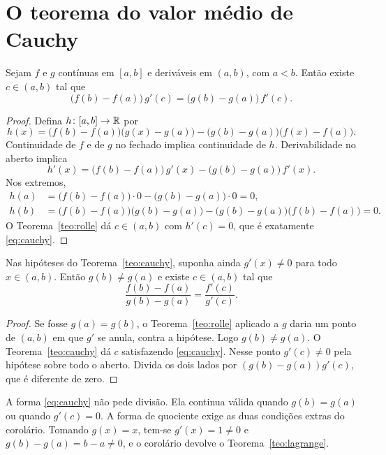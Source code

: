 \documentclass[11pt,a4paper]{article}
\begin{document}
\section{O teorema do valor médio de Cauchy}

\begin{teorema}\label{teo:cauchy}
Sejam $f$ e $g$ contínuas em $[a,b]$ e deriváveis em $(a,b)$, com $a<b$. Então existe $c\in(a,b)$ tal que
\begin{equation}
\label{eq:cauchy}
\bigl(f(b)-f(a)\bigr)\,g'(c)=\bigl(g(b)-g(a)\bigr)\,f'(c).
\end{equation}
\end{teorema}

\begin{proof}
Defina $h\colon[a,b]\to\mathbb{R}$ por
\[
h(x)=\bigl(f(b)-f(a)\bigr)\bigl(g(x)-g(a)\bigr)-\bigl(g(b)-g(a)\bigr)\bigl(f(x)-f(a)\bigr).
\]
Continuidade de $f$ e de $g$ no fechado implica continuidade de $h$. Derivabilidade no aberto implica
\[
h'(x)=\bigl(f(b)-f(a)\bigr)\,g'(x)-\bigl(g(b)-g(a)\bigr)\,f'(x).
\]
Nos extremos,
\begin{align*}
h(a)
&=\bigl(f(b)-f(a)\bigr)\cdot 0-\bigl(g(b)-g(a)\bigr)\cdot 0
=0,\\[0.4em]
h(b)
&=\bigl(f(b)-f(a)\bigr)\bigl(g(b)-g(a)\bigr)-\bigl(g(b)-g(a)\bigr)\bigl(f(b)-f(a)\bigr)
=0.
\end{align*}
O Teorema~\ref{teo:rolle} dá $c\in(a,b)$ com $h'(c)=0$, que é exatamente \eqref{eq:cauchy}.
\end{proof}

\begin{corolario}\label{cor:cauchy-quociente}
Nas hipóteses do Teorema~\ref{teo:cauchy}, suponha ainda $g'(x)\neq 0$ para todo $x\in(a,b)$. Então $g(b)\neq g(a)$ e existe $c\in(a,b)$ tal que
\[
\frac{f(b)-f(a)}{g(b)-g(a)}=\frac{f'(c)}{g'(c)}.
\]
\end{corolario}

\begin{proof}
Se fosse $g(a)=g(b)$, o Teorema~\ref{teo:rolle} aplicado a $g$ daria um ponto de $(a,b)$ em que $g'$ se anula, contra a hipótese. Logo $g(b)\neq g(a)$. O Teorema~\ref{teo:cauchy} dá $c$ satisfazendo \eqref{eq:cauchy}. Nesse ponto $g'(c)\neq 0$ pela hipótese sobre todo o aberto. Divida os dois lados por $(g(b)-g(a))g'(c)$, que é diferente de zero.
\end{proof}

\begin{observacao}
A forma \eqref{eq:cauchy} não pede divisão. Ela continua válida quando $g(b)=g(a)$ ou quando $g'(c)=0$. A forma de quociente exige as duas condições extras do corolário. Tomando $g(x)=x$, tem-se $g'(x)=1\neq 0$ e $g(b)-g(a)=b-a\neq 0$, e o corolário devolve o Teorema~\ref{teo:lagrange}.
\end{observacao}
\end{document}
